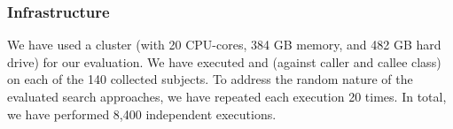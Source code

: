 \subsubsection{Infrastructure}
We have used a cluster (with 20 CPU-cores, 384 GB memory, and 482 GB hard drive) for our evaluation. We have executed \integration and \evosuite (against caller and callee class) on each of the 140 collected subjects. To address the random nature of the evaluated search approaches, we have repeated each execution 20 times. In total, we have performed 8,400 independent executions.






